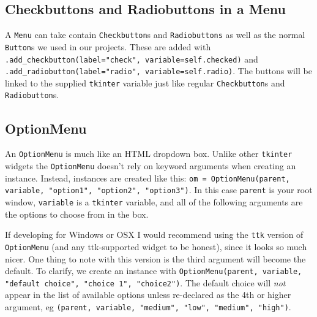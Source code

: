 \documentclass[a4paper,11pt,openany]{book}
\begin{document}
\subsection{Checkbuttons and Radiobuttons in a Menu}

A \lstinline[columns=fixed]{Menu} can take contain \lstinline[columns=fixed]{Checkbutton}s and \lstinline[columns=fixed]{Radiobuttons} as well as the normal \lstinline[columns=fixed]{Button}s we used in our projects. These are added with \lstinline[columns=fixed]{.add_checkbutton(label="check", variable=self.checked)} and \lstinline[columns=fixed]{.add_radiobutton(label="radio", variable=self.radio)}. The buttons will be linked to the supplied \lstinline[columns=fixed]{tkinter} variable just like regular \lstinline[columns=fixed]{Checkbutton}s and \lstinline[columns=fixed]{Radiobutton}s.

\subsection{OptionMenu}

An \lstinline[columns=fixed]{OptionMenu} is much like an HTML dropdown box. Unlike other \lstinline[columns=fixed]{tkinter} widgets the \lstinline[columns=fixed]{OptionMenu} doesn't rely on keyword arguments when creating an instance. Instead, instances are created like this: \lstinline[columns=fixed]{om = OptionMenu(parent, variable, "option1", "option2", "option3")}. In this case \lstinline[columns=fixed]{parent} is your root window, \lstinline[columns=fixed]{variable} is a \lstinline[columns=fixed]{tkinter} variable, and all of the following arguments are the options to choose from in the box. 

\vspace{5mm}

If developing for Windows or OSX I would recommend using the \lstinline[columns=fixed]{ttk} version of \lstinline[columns=fixed]{OptionMenu} (and any ttk-supported widget to be honest), since it looks so much nicer. One thing to note with this version is the third argument will become the default. To clarify, we create an instance with \lstinline[columns=fixed]{OptionMenu(parent, variable, "default choice", "choice 1", "choice2")}. The default choice will \textit{not} appear in the list of available options unless re-declared as the 4th or higher argument, eg \lstinline[columns=fixed]{(parent, variable, "medium", "low", "medium", "high")}.

\vspace{5mm}
\end{document}
